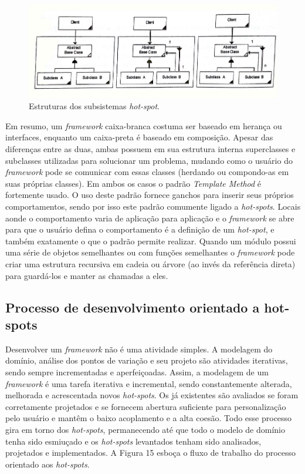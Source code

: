 \begin{figure}[h]
	\centering
	\label{fig14}
		\includegraphics[keepaspectratio=true,scale=0.4]{figuras/subsistemaHotspot.jpg}
	\caption{Estruturas dos subsistemas \textit{hot-spot}. \cite{Fayad1999}}
\end{figure}

Em resumo, um \textit{framework} caixa-branca costuma ser baseado em herança ou interfaces, enquanto um caixa-preta é baseado em composição. Apesar das diferenças entre as duas, ambas possuem em sua estrutura interna superclasses e subclasses utilizadas para solucionar um problema, mudando como o usuário do \textit{framework} pode se comunicar com essas classes (herdando ou compondo-as em suas próprias classes). Em ambos os casos o padrão \textit{Template Method} é fortemente usado. O uso deste padrão fornece ganchos para inserir seus próprios comportamentos, sendo por isso este padrão comumente ligado a \textit{hot-spots}. Locais aonde o comportamento varia de aplicação para aplicação e o \textit{framework} se abre para que o usuário defina o comportamento é a definição de um \textit{hot-spot}, e também exatamente o que o padrão permite realizar. Quando um módulo possui uma série de objetos semelhantes ou com funções semelhantes o \textit{framework} pode criar uma estrutura recursiva em cadeia ou árvore (ao invés da referência direta) para guardá-los e manter as chamadas a eles.

\subsection{Processo de desenvolvimento orientado a hot-spots}

Desenvolver um \textit{framework} não é uma atividade simples. A modelagem do domínio, análise dos pontos de variação e seu projeto são atividades iterativas, sendo sempre incrementadas e aperfeiçoadas. Assim, a modelagem de um \textit{framework} é uma tarefa iterativa e incremental, sendo constantemente alterada, melhorada e acrescentada novos \textit{hot-spots}. Os já existentes são avaliados se foram corretamente projetados e se fornecem abertura suficiente para personalização pelo usuário e mantêm o baixo acoplamento e a alta coesão. Todo esse processo gira em torno dos \textit{hot-spots}, permanecendo até que todo o modelo de domínio tenha sido esmiuçado e os \textit{hot-spots} levantados tenham sido analisados, projetados e implementados. A Figura 15 esboça o fluxo de trabalho do processo orientado aos \textit{hot-spots}.

